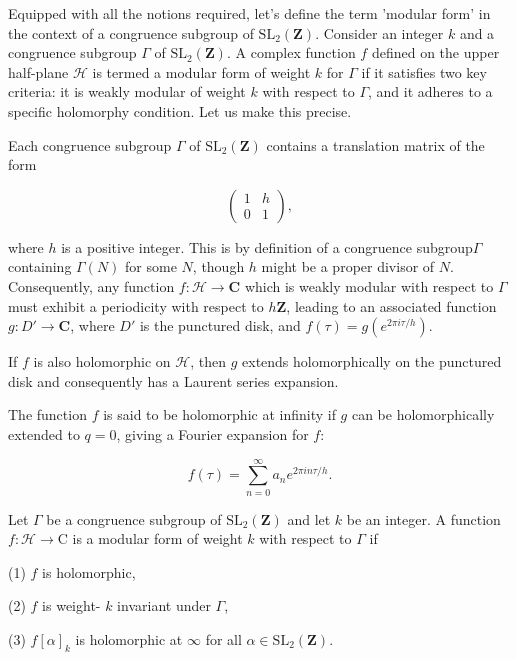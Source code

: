 Equipped with all the notions required, let's define the term 'modular form' in the context of a congruence subgroup of \( \mathrm{SL}_{2}(\mathbf{Z}) \). Consider an integer \( k \) and a congruence subgroup \( \Gamma \) of \( \mathrm{SL}_{2}(\mathbf{Z}) \). A complex function \( f \) defined on the upper half-plane \( \mathcal{H} \) is termed a modular form of weight \( k \) for \( \Gamma \) if it satisfies two key criteria: it is weakly modular of weight \( k \) with respect to \( \Gamma \), and it adheres to a specific holomorphy condition. Let us make this precise. 

Each congruence subgroup \( \Gamma \) of \( \mathrm{SL}_{2}(\mathbf{Z}) \) contains a translation matrix of the form

\[
\begin{pmatrix}
1 & h \\
0 & 1
\end{pmatrix},
\]

where \( h \) is a positive integer. This is by definition of a congruence subgroup\( \Gamma \) containing \( \Gamma(N) \) for some \( N \), though \( h \) might be a proper divisor of \( N \). \\
Consequently, any function \( f: \mathcal{H} \to \mathbf{C} \) which is weakly modular with respect to \( \Gamma \) must exhibit a periodicity with respect to \( h\mathbf{Z} \), leading to an associated function \( g: D' \to \mathbf{C} \), where \( D' \) is the punctured disk, and \( f(\tau) = g(e^{2\pi i\tau/h}) \). 

If \( f \) is also holomorphic on \( \mathcal{H} \), then \( g \) extends holomorphically on the punctured disk and consequently has a Laurent series expansion. \\

\begin{definition}
    The function \( f \) is said to be holomorphic at infinity if \( g \) can be holomorphically extended to \( q = 0 \), giving a Fourier expansion for \( f \):

\[
f(\tau) = \sum_{n=0}^{\infty} a_n e^{2\pi in\tau/h}.
\]

\end{definition}

\begin{definition}
    Let $\Gamma$ be a congruence subgroup of $\mathrm{SL}_{2}(\mathbf{Z})$ and let $k$ be an integer. A function $f: \mathcal{H} \longrightarrow \mathrm{C}$ is a modular form of weight $k$ with respect to $\Gamma$ if

(1) $f$ is holomorphic,

(2) $f$ is weight- $k$ invariant under $\Gamma$,

(3) $f[\alpha]_{k}$ is holomorphic at $\infty$ for all $\alpha \in \mathrm{SL}_{2}(\mathbf{Z})$.

\end{definition}

